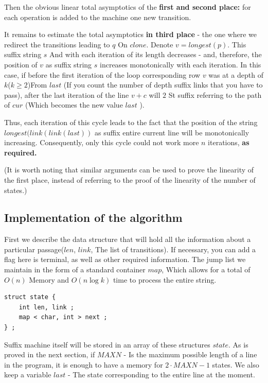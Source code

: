 Then the obvious linear total asymptotics of the \textbf{first and second place:} for each operation is added to the machine one new transition.

It remains to estimate the total asymptotics \textbf{in third place} - the one where we redirect the transitions leading to $q$ On $clone$. Denote $v = longest (p)$. This suffix string $s$ And with each iteration of its length decreases - and, therefore, the position of $v$ as suffix string $s$ increases monotonically with each iteration. In this case, if before the first iteration of the loop corresponding row $v$ was at a depth of $k$($k \ge 2$)From $last$ (If you count the number of depth suffix links that you have to pass), after the last iteration of the line $v + c$ will $2$ St suffix referring to the path of $cur$ (Which becomes the new value $last$ ).

Thus, each iteration of this cycle leads to the fact that the position of the string $longest (link (link (last))$ as suffix entire current line will be monotonically increasing. Consequently, only this cycle could not work more $n$ iterations, \textbf{as required.}

(It is worth noting that similar arguments can be used to prove the linearity of the first place, instead of referring to the proof of the linearity of the number of states.)

\subsection{ Implementation of the algorithm }

First we describe the data structure that will hold all the information about a particular passage($len$, $link$, The list of transitions). If necessary, you can add a flag here is terminal, as well as other required information. The jump list we maintain in the form of a standard container $map$, Which allows for a total of $O (n)$ Memory and $O (n \log k)$ time to process the entire string.

\begin{verbatim}
struct state {
    int len, link ;
    map < char, int > next ;
} ; 
\end{verbatim}
Suffix machine itself will be stored in an array of these structures $state$. As is proved in the next section, if $MAXN$ - Is the maximum possible length of a line in the program, it is enough to have a memory for $2 \cdot MAXN - 1$ states. We also keep a variable $last$ - The state corresponding to the entire line at the moment.

